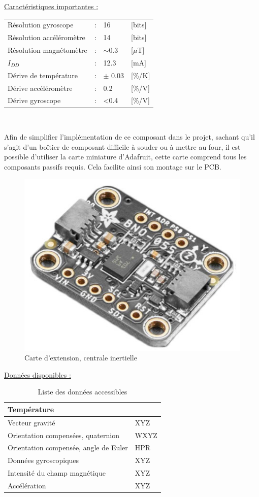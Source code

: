 \begin{center}
	\underline{Caractéristiques importantes :} \\
	\begin{tabular}{l l l l}
		Résolution gyroscope & : & 16 & [bits] \\
		Résolution accéléromètre & : & 14 & [bits] \\
		Résolution magnétomètre & : & $\sim$0.3 & [$\mu$T] \\
		$I_{DD}$ & : & 12.3 & [mA] \\
		Dérive de température & : & $\pm$ 0.03 & [\%/K] \\ 
		Dérive accéléromètre & : & 0.2 & [\%/V] \\
		Dérive gyroscope & : & <0.4 & [\%/V]
	\end{tabular} \\
\end{center}

Afin de simplifier l'implémentation de ce composant dans le projet, sachant qu'il s'agit d'un boîtier de composant difficile à souder ou à mettre au four, il est possible d'utiliser la carte miniature d'Adafruit, cette carte comprend tous les composants passifs requis. Cela facilite ainsi son montage sur le PCB.

\begin{figure}[h]
	\centering
	\includegraphics[width=0.4\linewidth]{../figures/pre_etude/BNO055_Adafruit}
	\caption{Carte d'extension, centrale inertielle}
	\label{fig:bno055adafruit}
\end{figure}

\begin{center}
	\underline{Données disponibles :}
	\begin{table}[h]
		\centering
		\begin{tabular}{|ll|}
		\hline
		Température & \\
		\hline
		Vecteur gravité & XYZ \\
		\hline
		Orientation compensées, quaternion & WXYZ \\
		\hline
		Orientation compensée, angle de Euler & HPR \\
		\hline
		Données gyroscopiques & XYZ \\
		\hline
		 Intensité du champ magnétique & XYZ \\
		\hline
		Accélération & XYZ \\
		\hline
	\end{tabular}
	\caption{Liste des données accessibles}
	\end{table}
\end{center}

